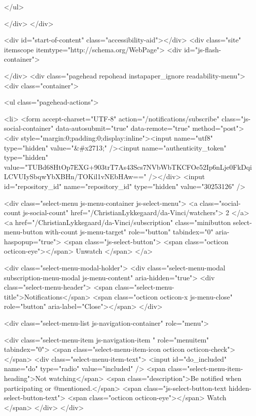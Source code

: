 </ul>


    
  </div>
</div>

      

        


      <div id="start-of-content" class="accessibility-aid"></div>
          <div class="site" itemscope itemtype="http://schema.org/WebPage">
    <div id="js-flash-container">
      
    </div>
    <div class="pagehead repohead instapaper_ignore readability-menu">
      <div class="container">
        
<ul class="pagehead-actions">

  <li>
      <form accept-charset="UTF-8" action="/notifications/subscribe" class="js-social-container" data-autosubmit="true" data-remote="true" method="post"><div style="margin:0;padding:0;display:inline"><input name="utf8" type="hidden" value="&#x2713;" /><input name="authenticity_token" type="hidden" value="TUBd68HtOp7EXG+903trT7As43Scs7NVbWbTKCFOe52Ip6nLje0FkDqiLCVUIySbqwYbXBHn/TOKil1vNEbHAw==" /></div>    <input id="repository_id" name="repository_id" type="hidden" value="30253126" />

      <div class="select-menu js-menu-container js-select-menu">
        <a class="social-count js-social-count" href="/ChristianLykkegaard/da-Vinci/watchers">
          2
        </a>
        <a href="/ChristianLykkegaard/da-Vinci/subscription"
          class="minibutton select-menu-button with-count js-menu-target" role="button" tabindex="0" aria-haspopup="true">
          <span class="js-select-button">
            <span class="octicon octicon-eye"></span>
            Unwatch
          </span>
        </a>

        <div class="select-menu-modal-holder">
          <div class="select-menu-modal subscription-menu-modal js-menu-content" aria-hidden="true">
            <div class="select-menu-header">
              <span class="select-menu-title">Notifications</span>
              <span class="octicon octicon-x js-menu-close" role="button" aria-label="Close"></span>
            </div>

            <div class="select-menu-list js-navigation-container" role="menu">

              <div class="select-menu-item js-navigation-item " role="menuitem" tabindex="0">
                <span class="select-menu-item-icon octicon octicon-check"></span>
                <div class="select-menu-item-text">
                  <input id="do_included" name="do" type="radio" value="included" />
                  <span class="select-menu-item-heading">Not watching</span>
                  <span class="description">Be notified when participating or @mentioned.</span>
                  <span class="js-select-button-text hidden-select-button-text">
                    <span class="octicon octicon-eye"></span>
                    Watch
                  </span>
                </div>
              </div>

